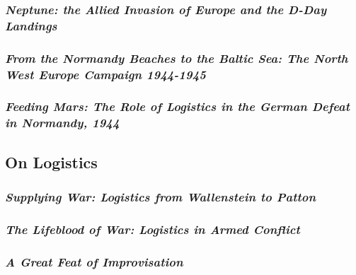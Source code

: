 \documentclass[noraggedright]{turabian-researchpaper}
\begin{document}
		\subsubsection{\textit{Neptune:  the Allied Invasion of 
			Europe and the D-Day Landings}}
		\subsubsection{\textit{From the Normandy Beaches to the 
			Baltic Sea: The North West Europe Campaign
			1944-1945}}
		\subsubsection{\textit{Feeding Mars:  The Role of Logistics
			in the German Defeat in Normandy, 1944}}

	\subsection{On Logistics}


		\subsubsection{\textit{Supplying War:  Logistics from
			Wallenstein to Patton}}
		\subsubsection{\textit{The Lifeblood of War: Logistics in
			Armed Conflict}}
		\subsubsection{\textit{A Great Feat of Improvisation}}
\end{document}
